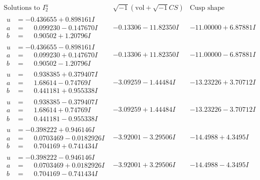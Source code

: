 \documentclass[1p]{elsarticle_modified}
\theoremstyle{definition}
\newcommand{\I}{\sqrt{-1}}
\begin{document}
$$\begin{array}{c|c|c}  
\text{Solutions to }I^u_{2}& \I (\text{vol} + \sqrt{-1}CS) & \text{Cusp shape}\\
 \hline 
\begin{aligned}
u &= -0.436655 + 0.898161 I \\
a &= \phantom{-}0.099230 - 0.147670 I \\
b &= \phantom{-}0.90502 + 1.20796 I\end{aligned}
 & -0.13306 - 11.82350 I & -11.00000 + 6.87881 I \\ \hline\begin{aligned}
u &= -0.436655 - 0.898161 I \\
a &= \phantom{-}0.099230 + 0.147670 I \\
b &= \phantom{-}0.90502 - 1.20796 I\end{aligned}
 & -0.13306 + 11.82350 I & -11.00000 - 6.87881 I \\ \hline\begin{aligned}
u &= \phantom{-}0.938385 + 0.379407 I \\
a &= \phantom{-}1.68614 - 0.74769 I \\
b &= \phantom{-}0.441181 + 0.955338 I\end{aligned}
 & -3.09259 - 1.44484 I & -13.23226 + 3.70712 I \\ \hline\begin{aligned}
u &= \phantom{-}0.938385 - 0.379407 I \\
a &= \phantom{-}1.68614 + 0.74769 I \\
b &= \phantom{-}0.441181 - 0.955338 I\end{aligned}
 & -3.09259 + 1.44484 I & -13.23226 - 3.70712 I \\ \hline\begin{aligned}
u &= -0.398222 + 0.946146 I \\
a &= \phantom{-}0.0703469 - 0.0182926 I \\
b &= \phantom{-}0.704169 + 0.741434 I\end{aligned}
 & -3.92001 - 3.29506 I & -14.4988 + 4.3495 I \\ \hline\begin{aligned}
u &= -0.398222 - 0.946146 I \\
a &= \phantom{-}0.0703469 + 0.0182926 I \\
b &= \phantom{-}0.704169 - 0.741434 I\end{aligned}
 & -3.92001 + 3.29506 I & -14.4988 - 4.3495 I \\ \hline\begin{aligned}

\end{aligned}
\end{array}$$
\end{document}
